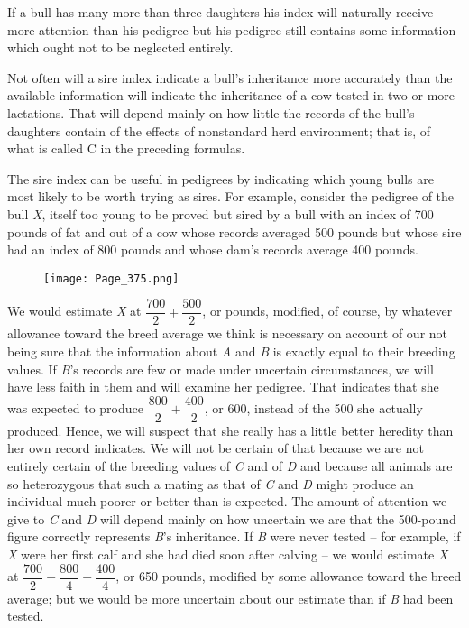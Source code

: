 If a bull has many more than three daughters his index will naturally
receive more attention than his pedigree but his pedigree still
contains some information which ought not to be neglected entirely.

Not often will a sire index indicate a bull's inheritance more accurately
than the available information will indicate the inheritance of a
cow tested in two or more lactations. That will depend mainly on how
little the records of the bull's daughters contain of the effects of nonstandard
herd environment; that is, of what is called C in the preceding
formulas.

The sire index can be useful in pedigrees by indicating which young
bulls are most likely to be worth trying as sires. For example, consider
the pedigree of the bull \textit{X}, itself too young to be proved but
sired by a bull with an index of 700 pounds of fat and out of a cow whose
records averaged 500 pounds but whose sire had an index of 800 pounds and
whose dam's records average 400 pounds.

\begin{figure}[h]
	\centering
    \texttt{[image: Page\_375.png]}
\end{figure}

\noindent
We would estimate \textit{X} at \(\dfrac{700}{2} + \dfrac{500}{2}\), or
pounds, modified, of course, by whatever allowance toward the breed
average we think is necessary on account of our not being sure that the
information about \textit{A} and \textit{B} is exactly equal to their
breeding values. If \textit{B}'s records are few or made under uncertain
circumstances, we will have less faith in them and will examine her
pedigree. That indicates that she was expected to produce
\(\dfrac{800}{2} + \dfrac{400}{2}\), or 600, instead of the 500 she
actually produced. Hence, we will suspect that she really has a little
better heredity than her own record indicates. We will not be certain
of that because we are not entirely certain of the breeding values of
\textit{C} and of \textit{D} and because all animals are so heterozygous
that such a mating as that of \textit{C} and \textit{D} might produce
an individual much poorer or better than is expected. The amount of
attention we give to \textit{C} and \textit{D} will depend mainly on how
uncertain we are that the 500-pound figure correctly represents \textit{B}'s
inheritance. If \textit{B} were never tested -- for example, if \textit{X}
were her first calf and she had died soon after calving -- we would estimate
\textit{X} at \(\dfrac{700}{2} + \dfrac{800}{4} + \dfrac{400}{4}\), or 650
pounds, modified by some allowance toward the breed average; but we would
be more uncertain about our estimate than if \textit{B} had been tested.

